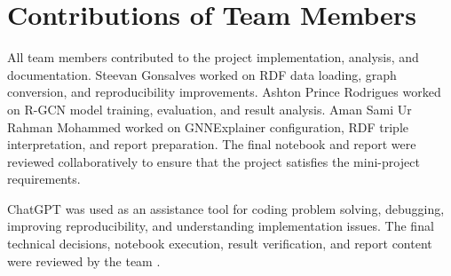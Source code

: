 \documentclass[runningheads]{llncs}
\begin{document}
\section{Contributions of Team Members}

All team members contributed to the project implementation, analysis, and documentation. Steevan Gonsalves worked on RDF data loading, graph conversion, and reproducibility improvements. Ashton Prince Rodrigues worked on R-GCN model training, evaluation, and result analysis. Aman Sami Ur Rahman Mohammed worked on GNNExplainer configuration, RDF triple interpretation, and report preparation. The final notebook and report were reviewed collaboratively to ensure that the project satisfies the mini-project requirements.

ChatGPT was used as an assistance tool for coding problem solving, debugging, improving reproducibility, and understanding implementation issues. The final technical decisions, notebook execution, result verification, and report content were reviewed by the team \cite{chatgpt}.
\end{document}
